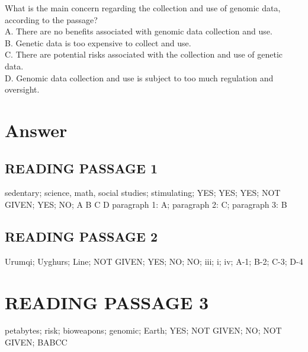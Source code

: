 \documentclass[10pt, a4paper, oneside]{article}
\begin{document}
\begin{spacing}{2.0}
What is the main concern regarding the collection and use of genomic data, according to the passage?\\
A. There are no benefits associated with genomic data collection and use.\\
B. Genetic data is too expensive to collect and use.\\
C. There are potential risks associated with the collection and use of genetic data.\\
D. Genomic data collection and use is subject to too much regulation and oversight.\\

\section{Answer}
\subsection{READING PASSAGE 1}

sedentary;
science, math, social studies;
stimulating;
YES;
YES;
YES;
NOT GIVEN;
YES;
NO;
A
B
C
D
paragraph 1: A;
paragraph 2: C;
paragraph 3: B
\subsection{READING PASSAGE 2}
Urumqi;
Uyghurs;
Line;
NOT GIVEN;
YES;
NO;
NO;
iii;
i;
iv;
A-1;
B-2;
C-3;
D-4
\section{READING PASSAGE 3}
petabytes;
risk;
bioweapons;
genomic;
Earth;
YES;
NOT GIVEN;
NO;
NOT GIVEN;
BABCC

\end{spacing}{}
\end{document}
